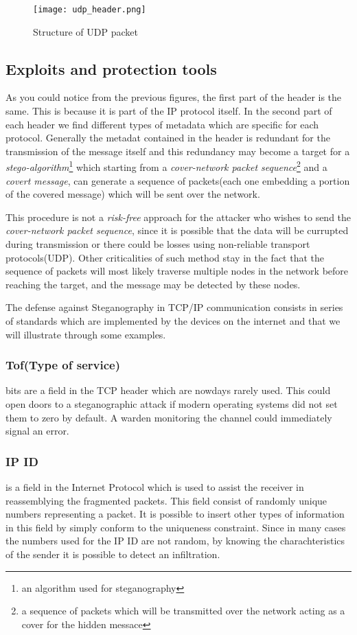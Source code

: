 \documentclass[../../main.tex]{subfiles}
\begin{document}
\begin{figure}[h]
    \centering
    \caption{Structure of UDP packet}
    \texttt{[image: udp\_header.png]}
\end{figure}


\subsection{Exploits and protection tools}

As you could notice from the previous figures, the first part of the header
is the same. This is because it is part of the IP protocol itself.
In the second part of each header we find different types of metadata which
are specific for each protocol. Generally the metadat contained in the
header is redundant for the transmission of the message itself and this 
redundancy may become a target for a \emph{stego-algorithm}\footnote{an
algorithm used for steganography} which starting from a \emph{cover-network
packet sequence}\footnote{a sequence of packets which will be transmitted
over the network acting as a cover for the hidden messace} and a
\emph{covert message}, can generate a sequence of packets(each one embedding
a portion of the covered message) which will be sent over the network.

This procedure is not a \emph{risk-free} approach for the attacker who
wishes to send the \emph{cover-network packet sequence}, since it is
possible that the data will be currupted during transmission or there could
be losses using non-reliable transport protocols(UDP).
Other criticalities of such method stay in the fact that the sequence of
packets will most likely traverse multiple nodes in the network before
reaching the target, and the message may be detected by these nodes.

The defense against Steganography in TCP/IP communication consists in 
series of standards which are implemented by the devices on the internet and
that we will illustrate through some examples.


\subsubsection{Tof(Type of service)} bits are a field in the TCP header which
are nowdays rarely used. This could open doors to a steganographic attack if
modern operating systems did not set them to zero by default.
A warden monitoring the channel could immediately signal an error.

\subsubsection{IP ID} is a field in the Internet Protocol which is used to
assist the receiver in reassemblying the fragmented packets.
This field consist of randomly unique numbers representing a packet.
It is possible to insert other types of information in this field by simply
conform to the uniqueness constraint.
Since in many cases the numbers used for the IP ID are not random, by
knowing the charachteristics of the sender it is possible to detect an
infiltration.
\end{document}
